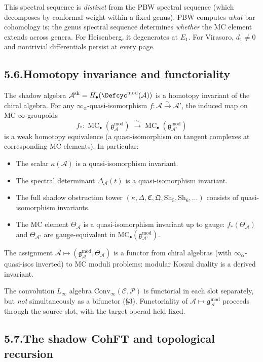 \documentclass[11pt]{report}
\theoremstyle{definition}
\theoremstyle{remark}
\providecommand{\cA}{\mathcal{A}}
\providecommand{\cC}{\mathcal{C}}
\providecommand{\cP}{\mathcal{P}}
\providecommand{\gAmod}{\mathfrak{g}^{\mathrm{mod}}_\cA}
\providecommand{\Convinf}{\mathrm{Conv}_\infty}
\numberwithin{equation}{section}
\begin{document}
This spectral sequence is \emph{distinct} from the PBW spectral
sequence (which decomposes by conformal weight within a fixed genus).
PBW computes \emph{what} bar cohomology is;
the genus spectral sequence determines \emph{whether} the MC element
extends across genera. For Heisenberg, it
degenerates at $E_1$. For Virasoro,
$d_1\neq 0$ and nontrivial differentials persist at every page.

\subsection*{5.6.\enspace Homotopy invariance and functoriality}

The shadow algebra
$\cA^{\mathrm{sh}}=H_\bullet(\Defcyc^{\mathrm{mod}}(\cA))$ is a
homotopy invariant of the chiral algebra. For any
$\infty_\alpha$-quasi-isomorphism
$f\colon\cA\xrightarrow{\sim}\cA'$, the induced map on MC
$\infty$-groupoids
\[
f_*\colon
\operatorname{MC}_\bullet(\gAmod)
\;\xrightarrow{\;\sim\;}
\operatorname{MC}_\bullet(\mathfrak g^{\mathrm{mod}}_{\cA'})
\]
is a weak homotopy equivalence (a quasi-isomorphism on tangent
complexes at corresponding MC elements). In particular:
\begin{itemize}
\item The scalar $\kappa(\cA)$ is a quasi-isomorphism invariant.
\item The spectral determinant $\Delta_\cA(t)$ is a
 quasi-isomorphism invariant.
\item The full shadow obstruction tower
 $(\kappa,\Delta,\mathfrak C,\mathfrak Q,\mathrm{Sh}_5,
 \mathrm{Sh}_6,\dots)$ consists of quasi-isomorphism invariants.
\item The MC element $\Theta_\cA$ is a quasi-isomorphism invariant
 up to gauge: $f_*(\Theta_\cA)$ and $\Theta_{\cA'}$ are
 gauge-equivalent in $\mathrm{MC}_\bullet(\mathfrak
 g^{\mathrm{mod}}_{\cA'})$.
\end{itemize}

The assignment
$\cA\mapsto(\gAmod,\Theta_\cA)$ is a functor from
chiral algebras (with $\infty_\alpha$-quasi-isos
inverted) to MC moduli problems:
modular Koszul duality is a derived invariant.

The convolution $L_\infty$ algebra
$\Convinf(\cC,\cP)$ is functorial in each slot separately, but
\emph{not} simultaneously as a bifunctor (\S3). Functoriality of
$\cA\mapsto\gAmod$ proceeds through the source slot,
with the target operad held fixed.

\subsection*{5.7.\enspace The shadow CohFT and topological recursion}
\end{document}
